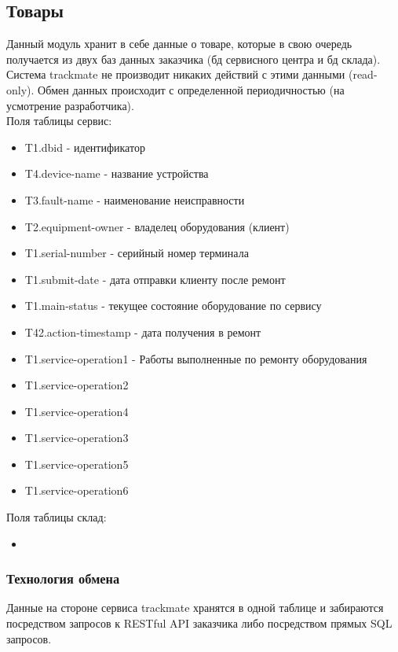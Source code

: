 \documentclass[DIV=calc, paper=a4, fontsize=11pt]{scrartcl} %
\begin{document}
\subsection{Товары}

Данный модуль хранит в себе данные о товаре, которые в свою очередь получается из двух баз данных заказчика (бд сервисного центра и бд склада). Система trackmate не производит никаких действий с этими данными (read-only). Обмен данных происходит с определенной периодичностью (на усмотрение разработчика).
\\[0.5cm]
Поля таблицы сервис:

\begin{itemize}
	\item T1.dbid - идентификатор
	\item T4.device-name - название устройства
	\item T3.fault-name - наименование неисправности
	\item T2.equipment-owner - владелец оборудования (клиент)
	\item T1.serial-number - серийный номер терминала
	\item T1.submit-date - дата отправки клиенту после ремонт
	\item T1.main-status - текущее состояние оборудование по сервису
	\item T42.action-timestamp - дата получения в ремонт
	\item T1.service-operation1 - Работы выполненные по ремонту оборудования
	\item T1.service-operation2
	\item T1.service-operation4
	\item T1.service-operation3
	\item T1.service-operation5
	\item T1.service-operation6
\end{itemize}

Поля таблицы склад:

\begin{itemize}
	\item 
\end{itemize}

\subsubsection{Технология обмена}
Данные на стороне сервиса trackmate хранятся в одной таблице и забираются посредством запросов к RESTful API заказчика либо посредством прямых SQL запросов. 
\end{document}
